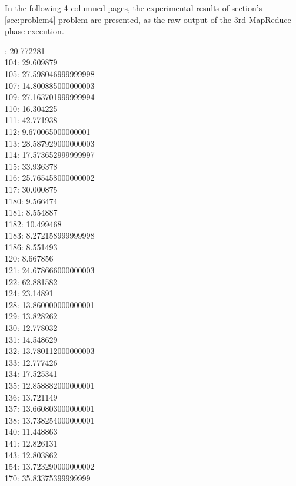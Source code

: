In the following 4-columned pages, the experimental results of section's \ref{sec:problem4} problem are presented,
as the
raw output of the 3rd MapReduce phase execution.

\begin{multicols}{4}
  : 20.772281
  \\ 104: 29.609879
  \\ 105: 27.598046999999998
  \\ 107: 14.800885000000003
  \\ 109: 27.163701999999994
  \\ 110: 16.304225
  \\ 111: 42.771938
  \\ 112: 9.670065000000001
  \\ 113: 28.587929000000003
  \\ 114: 17.573652999999997
  \\ 115: 33.936378
  \\ 116: 25.765458000000002
  \\ 117: 30.000875
  \\ 1180: 9.566474
  \\ 1181: 8.554887
  \\ 1182: 10.499468
  \\ 1183: 8.272158999999998
  \\ 1186: 8.551493
  \\ 120: 8.667856
  \\ 121: 24.678666000000003
  \\ 122: 62.881582
  \\ 124: 23.14891
  \\ 128: 13.860000000000001
  \\ 129: 13.828262
  \\ 130: 12.778032
  \\ 131: 14.548629
  \\ 132: 13.780112000000003
  \\ 133: 12.777426
  \\ 134: 17.525341
  \\ 135: 12.858882000000001
  \\ 136: 13.721149
  \\ 137: 13.660803000000001
  \\ 138: 13.738254000000001
  \\ 140: 11.448863
  \\ 141: 12.826131
  \\ 143: 12.803862
  \\ 154: 13.723290000000002
  \\ 170: 35.83375399999999

\end{multicols}
